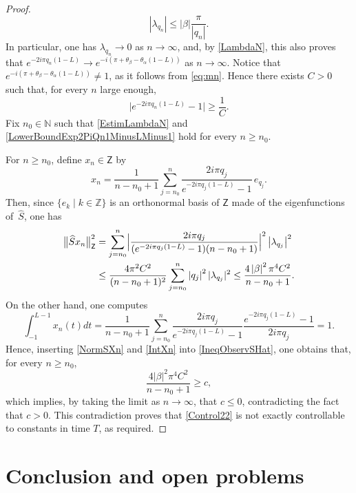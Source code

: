 \documentclass[10pt]{article}
\theoremstyle{plain}
\theoremstyle{definition}
\newcommand{\abs}[1]{\left\lvert #1\right \rvert}
\newcommand{\bnorm}[1]{\bigl\lVert #1\bigr\lVert}
\newcommand{\babs}[1]{\bigl\lvert #1\bigr \rvert}
\newcommand{\Babs}[1]{\Bigl\lvert #1\Bigr \rvert}
\newcommand{\nabs}[1]{\lvert #1 \rvert}
\numberwithin{equation}{section}\numberwithin{figure}{section}\emergencystretch=3em
\begin{document}
\begin{proof}
\begin{equation}
\abs{\lambda_{q_n}} \leq \abs{\beta} \frac{\pi}{\abs{q_n}}.
\end{equation}
In particular, one has $\lambda_{q_n} \to 0$ as $n \to \infty$, and, by \eqref{LambdaN}, this also proves that $e^{- 2 i \pi q_n (1 - L)} \to e^{-i(\pi + \theta_\beta - \theta_\alpha(1 - L))}$ as $n \to \infty$. Notice that $e^{-i(\pi + \theta_\beta - \theta_\alpha(1 - L))} \neq 1$, as it follows from \eqref{eq:mn}. Hence there exists $C > 0$ such that, for every $n$ large enough,
\begin{equation}
\label{LowerBoundExp2PiQn1MinusLMinus1}
\babs{e^{- 2 i \pi q_n (1 - L)} - 1} \geq \frac{1}{C}.
\end{equation}
Fix $n_0 \in \mathbb N$ such that \eqref{EstimLambdaN} and \eqref{LowerBoundExp2PiQn1MinusLMinus1} hold for every $n \geq n_0$.

For $n \geq n_0$, define $x_n \in \mathsf Z$ by
\[
x_n = \frac{1}{n - n_0 + 1} \sum_{j = n_0}^n \frac{2 i \pi q_j}{e^{- 2 i \pi q_j (1 - L)} - 1}\, e_{q_j}.
\]
Then, since $\{e_k \mid k \in \mathbb Z\}$ is an orthonormal basis of $\mathsf Z$ made of the eigenfunctions of~$\widehat S$, one has
\begin{equation}
\label{NormSXn}
\begin{aligned}
\bnorm{\widehat S x_n}_{\mathsf Z}^2 & = \sum_{j = n_0}^n \Babs{\frac{2 i \pi q_j}{(e^{- 2 i \pi q_j (1 - L)} - 1)(n - n_0 + 1)}}^2 \abs{\lambda_{q_j}}^2 \\
& \leq \frac{4 \pi^2 C^2}{(n - n_0 + 1)^2} \sum_{j = n_0}^n \abs{q_j}^2 \nabs{\lambda_{q_j}}^2 \leq \frac{4 \abs{\beta}^2 \pi^4 C^2}{n - n_0 + 1}.
\end{aligned}
\end{equation}
On the other hand, one computes
\begin{equation}
\label{IntXn}
\int_{-1}^{L - 1} x_n(t) dt = \frac{1}{n - n_0 + 1} \sum_{j = n_0}^n \frac{2 i \pi q_j}{e^{- 2 i \pi q_j (1 - L)} - 1} \frac{e^{- 2 i \pi q_j (1 - L)} - 1}{2 i \pi q_j} = 1.
\end{equation}
Hence, inserting \eqref{NormSXn} and \eqref{IntXn} into \eqref{IneqObservSHat}, one obtains that, for every $n \geq n_0$,
\[
\frac{4 \abs{\beta}^2 \pi^4 C^2}{n - n_0 + 1} \geq c,
\]
which implies, by taking the limit as $n \to \infty$, that $c \leq 0$, contradicting the fact that $c > 0$. This contradiction proves that \eqref{Control22} is not exactly controllable to constants in time $T$, as required.
\end{proof}

\section{Conclusion and open problems}
\end{document}
